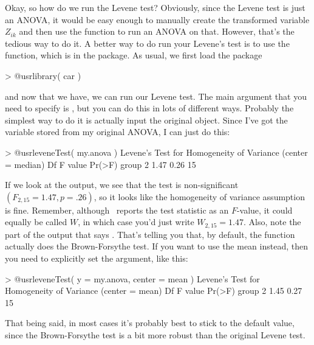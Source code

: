 
Okay, so how do we run the Levene test? Obviously, since the Levene test is just an ANOVA, it would be easy enough to manually create the transformed variable $Z_{ik}$ and then use the  function to run an ANOVA on that. However, that's the tedious way to do it. A better way to do run your Levene's test is to use the  function, which is in the  package.  As usual, we first load the package
\begin{rblock1}
> @usr{library( car )}  
\end{rblock1}
and now that we have, we can run our Levene test. The main argument that you need to specify is , but you can do this in lots of different ways. Probably the simplest way to do it is actually input the original  object. Since I've got the  variable stored from my original ANOVA, I can just do this:
\begin{rblock1}
> @usr{leveneTest( my.anova )}
Levene's Test for Homogeneity of Variance (center = median)
      Df F value Pr(>F)
group  2    1.47   0.26
      15   
\end{rblock1}
If we look at the output, we see that the test is non-significant $(F_{2,15} = 1.47, p = .26)$, so it looks like the homogeneity of variance assumption is fine. Remember, although \R\ reports the test statistic as an $F$-value, it could equally be called $W$, in which case you'd just write $W_{2,15} = 1.47$. Also, note the part of the output that says . That's telling you that, by default, the  function actually does the Brown-Forsythe test. If you want to use the mean instead, then you need to explicitly set the  argument, like this:
\begin{rblock1}
> @usr{leveneTest( y = my.anova, center = mean )}  
Levene's Test for Homogeneity of Variance (center = mean)
      Df F value Pr(>F)
group  2    1.45   0.27
      15 
\end{rblock1}
That being said, in most cases it's probably best to stick to the default value, since the Brown-Forsythe test is a bit more robust than the original Levene test.


